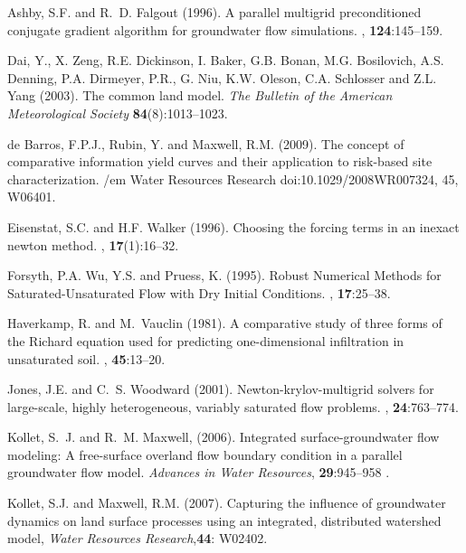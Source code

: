 \begin{thebibliography}{99}

Ashby, S.F. and R.~D. Falgout (1996).
\newblock A parallel multigrid preconditioned conjugate gradient algorithm for
  groundwater flow simulations.
, {\bf 124}:145--159.

Dai, Y., X. Zeng, R.E. Dickinson, I. Baker, G.B. Bonan, M.G. Bosilovich, A.S. Denning, P.A. Dirmeyer, P.R., G. Niu, K.W. Oleson, C.A. Schlosser and Z.L. Yang (2003). The common land model. {\em The Bulletin of the American Meteorological Society} {\bf 84}(8):1013--1023.

de Barros, F.P.J., Rubin, Y. and Maxwell, R.M. (2009). The concept of comparative information yield curves and their application to risk-based site characterization. {/em Water Resources Research} doi:10.1029/2008WR007324, 45, W06401.

Eisenstat, S.C. and H.F. Walker (1996).
\newblock Choosing the forcing terms in an inexact newton method.
, {\bf 17}(1):16--32.

Forsyth, P.A. Wu, Y.S. and Pruess, K. (1995).
\newblock Robust Numerical Methods for Saturated-Unsaturated Flow with Dry Initial Conditions.
, {\bf 17}:25--38.

Haverkamp, R. and M.~Vauclin (1981).
\newblock A comparative study of three forms of the {R}ichard equation used for
  predicting one-dimensional infiltration in unsaturated soil.
, {\bf 45}:13--20.


Jones, J.E. and C.~S. Woodward (2001).
\newblock Newton-krylov-multigrid solvers for large-scale, highly heterogeneous, variably saturated flow problems.
, {\bf 24}:763--774.

Kollet, S.~J. and R.~M. Maxwell, (2006). Integrated
surface-groundwater flow
  modeling: A free-surface overland flow boundary condition in a parallel
  groundwater flow model. {\em Advances in Water Resources}, {\bf 29}:945--958 .

Kollet, S.J. and Maxwell, R.M. (2007). Capturing the influence of groundwater dynamics on land surface processes using an integrated, distributed watershed model, { \em Water Resources Research},{\bf 44}: W02402.


\end{thebibliography}
